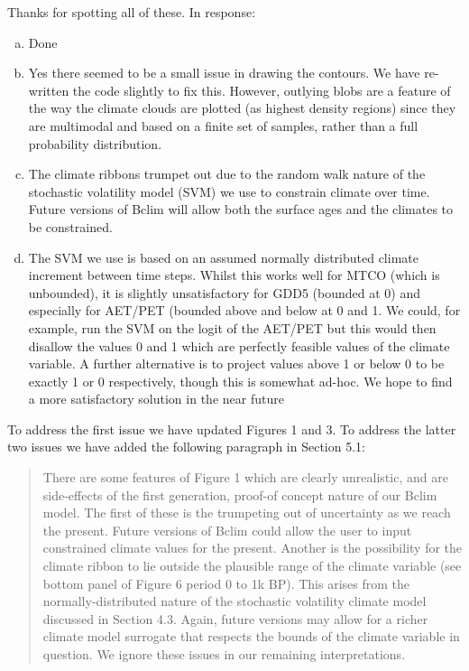 \documentclass[a4paper,11pt]{article}
\begin{document}
Thanks for spotting all of these. In response:
\begin{enumerate}[(a)]
\item Done
\item Yes there seemed to be a small issue in drawing the contours. We have re-written the code slightly to fix this. However, outlying blobs are a feature of the way the climate clouds are plotted (as highest density regions) since they are multimodal and based on a finite set of samples, rather than a full probability distribution. 
\item The climate ribbons trumpet out due to the random walk nature of the stochastic volatility model (SVM) we use to constrain climate over time. Future versions of Bclim will allow both the surface ages and the climates to be constrained.
\item The SVM we use is based on an assumed normally distributed climate increment between time steps. Whilst this works well for MTCO (which is unbounded), it is slightly unsatisfactory for GDD5 (bounded at 0) and especially for AET/PET (bounded above and below at 0 and 1. We could, for example, run the SVM on the logit of the AET/PET but this would then disallow the values 0 and 1 which are perfectly feasible values of the climate variable. A further alternative is to project values above 1 or below 0 to be exactly 1 or 0 respectively, though this is somewhat ad-hoc. We hope to find a more satisfactory solution in the near future
\end{enumerate}

To address the first issue we have updated Figures 1 and 3. To address the latter two issues we have added the following paragraph in Section 5.1:

\begin{quote}
There are some features of Figure 1 which are clearly unrealistic, and are side-effects of the first generation, proof-of concept nature of our Bclim model. The first of these is the trumpeting out of uncertainty as we reach the present. Future versions of Bclim could allow the user to input constrained climate values for the present. Another is the possibility for the climate ribbon to lie outside the plausible range of the climate variable (see bottom panel of Figure 6 period 0 to 1k BP). This arises from the normally-distributed nature of the stochastic volatility climate model discussed in Section 4.3. Again, future versions may allow for a richer climate model surrogate that respects the bounds of the climate variable in question. We ignore these issues in our remaining interpretations.
\end{quote}
\end{document}
